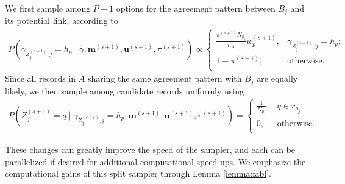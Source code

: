 \documentclass[ba]{imsart}
\begin{document}
We first sample among $P + 1$ options for the agreement pattern between $B_j$ and its potential link, according to
\begin{align}
	\label{eqn:gibbs1}
	P\left( \gamma_{Z_j^{(s+1)}, j} = h_p \mid \tilde{\gamma}, \bm{m}^{(s+1)}, \bm{u}^{(s+1)}, \pi^{(s+1)}\right) \propto
	\begin{cases} 
		\frac{\pi^{(s+1)}N_{p_j}}{n_A}  w_{p}^{(s+1)},  & \gamma_{Z_j^{(s+1)}, j} = h_p; \\
		1- \pi^{(s+1)} , &   \text{otherwise}. \\
	\end{cases}
\end{align}
Since all records in $A$ sharing the same agreement pattern with $B_j$ are equally likely, we then sample among candidate records uniformly using
\begin{align}
	\label{eqn:gibbs2}
	P\left(Z_j^{(s+1)} = q \mid \gamma_{Z_j^{(s+1)}, j} = h_p, \bm{m}^{(s+1)}, \bm{u}^{(s+1)}, \pi^{(s+1)} \right) = \begin{cases} 
		\frac{1}{N_{p_j}}, & q \in r_{p_j}; \\
		0, & \text{otherwise.} \\
	\end{cases}
\end{align} 

These changes can greatly improve the speed of the sampler, and each can be parallelized if desired for additional computational speed-ups. We emphasize the computational gains of this split sampler through Lemma \ref{lemma:fabl}.
\end{document}
